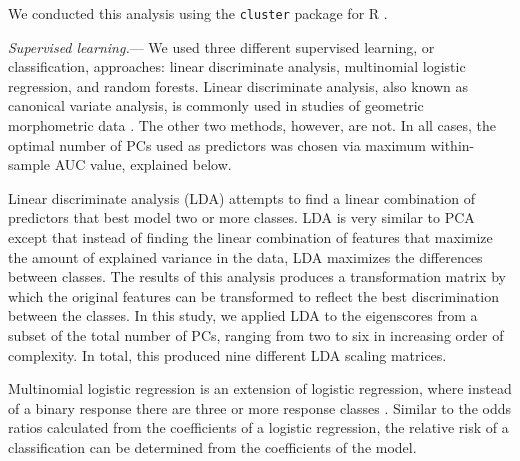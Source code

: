 \documentclass[12pt,letterpaper]{article}
\renewcommand{\subsubsection}[1]{%
\vspace{2ex}
\noindent
\textit{#1.}---}
\begin{document}

We conducted this analysis using the \texttt{cluster} package for R \citep{Maechler2013}.

\subsubsection{Supervised learning}
We used three different supervised learning, or classification, approaches: linear discriminate analysis, multinomial logistic regression, and random forests. Linear discriminate analysis, also known as canonical variate analysis, is commonly used in studies of geometric morphometric data \citep{Zelditch2004,Mitteroecker2011}. The other two methods, however, are not. In all cases, the optimal number of PCs used as predictors was chosen via maximum within-sample AUC value, explained below.

Linear discriminate analysis (LDA) attempts to find a linear combination of predictors that best model two or more classes. LDA is very similar to PCA except that instead of finding the linear combination of features that maximize the amount of explained variance in the data, LDA maximizes the differences between classes. The results of this analysis produces a transformation matrix by which the original features can be transformed to reflect the best discrimination between the classes. In this study, we applied LDA to the eigenscores from a subset of the total number of PCs, ranging from two to six in increasing order of complexity. In total, this produced nine different LDA scaling matrices. 

Multinomial logistic regression is an extension of logistic regression, where instead of a binary response there are three or more response classes \citep{Venables2002a}. Similar to the odds ratios calculated from the coefficients of a logistic regression, the relative risk of a classification can be determined from the coefficients of the model.
\end{document}

